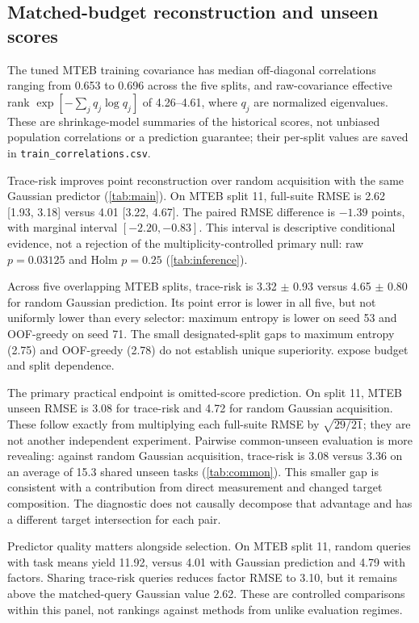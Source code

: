 \documentclass{article}
\begin{document}
\subsection{Matched-budget reconstruction and unseen scores}
The tuned MTEB training covariance has median off-diagonal correlations ranging from 0.653 to 0.696 across the five splits, and raw-covariance effective rank $\exp[-\sum_j q_j\log q_j]$ of 4.26--4.61, where $q_j$ are normalized eigenvalues. These are shrinkage-model summaries of the historical scores, not unbiased population correlations or a prediction guarantee; their per-split values are saved in \texttt{train\_correlations.csv}.

Trace-risk improves point reconstruction over random acquisition with the same Gaussian predictor (\cref{tab:main}). On MTEB split 11, full-suite RMSE is 2.62 [1.93, 3.18] versus 4.01 [3.22, 4.67]. The paired RMSE difference is $-1.39$ points, with marginal interval $[-2.20,-0.83]$. This interval is descriptive conditional evidence, not a rejection of the multiplicity-controlled primary null: raw $p=0.03125$ and Holm $p=0.25$ (\cref{tab:inference}).

Across five overlapping MTEB splits, trace-risk is 3.32 $\pm$ 0.93 versus 4.65 $\pm$ 0.80 for random Gaussian prediction. Its point error is lower in all five, but not uniformly lower than every selector: maximum entropy is lower on seed 53 and OOF-greedy on seed 71. The small designated-split gaps to maximum entropy (2.75) and OOF-greedy (2.78) do not establish unique superiority.  expose budget and split dependence.

The primary practical endpoint is omitted-score prediction. On split 11, MTEB unseen RMSE is 3.08 for trace-risk and 4.72 for random Gaussian acquisition. These follow exactly from multiplying each full-suite RMSE by $\sqrt{29/21}$; they are not another independent experiment. Pairwise common-unseen evaluation is more revealing: against random Gaussian acquisition, trace-risk is 3.08 versus 3.36 on an average of 15.3 shared unseen tasks (\cref{tab:common}). This smaller gap is consistent with a contribution from direct measurement and changed target composition. The diagnostic does not causally decompose that advantage and has a different target intersection for each pair.

Predictor quality matters alongside selection. On MTEB split 11, random queries with task means yield 11.92, versus 4.01 with Gaussian prediction and 4.79 with factors. Sharing trace-risk queries reduces factor RMSE to 3.10, but it remains above the matched-query Gaussian value 2.62. These are controlled comparisons within this panel, not rankings against methods from unlike evaluation regimes.
\end{document}
